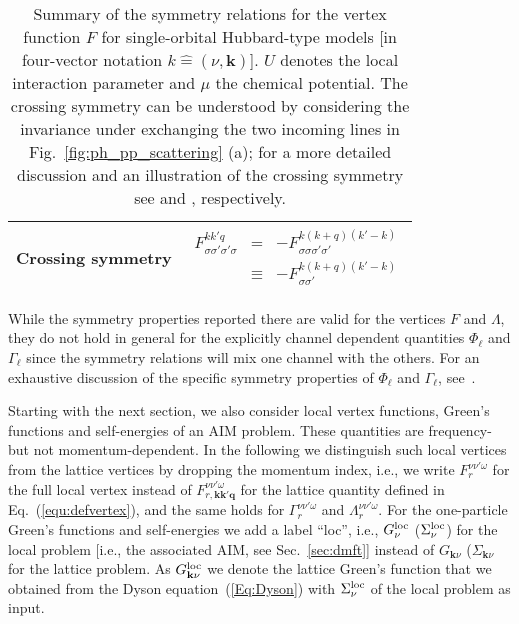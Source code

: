 \documentclass[rmp,aps,reprint,amsmath,amssymb,superscriptaddress,showpacs,nofootinbib]{revtex4-1}
\begin{document}
\begin{table}[t!]
\begin{tabular}{|m{}|m{}|}
  \begin{center} Crossing symmetry\end{center} &
\begin{eqnarray*}F_{\sigma\sigma'\sigma'\sigma}^{kk'q}&=&-F_{\sigma\sigma\sigma'\sigma'}^{k(k+q) (k'-k)}\\ &\equiv&-F_{\sigma\sigma'}^{k(k+q) (k'-k)} \end{eqnarray*}\\ \hline
\end{tabular} 
\caption{Summary of the symmetry relations for the vertex function $F$ for single-orbital Hubbard-type models 
[in four-vector notation $k\widehat{=}(\nu,\mathbf{k})$]. $U$ denotes the local interaction parameter and $\mu$ the chemical potential. The crossing symmetry can be understood by considering the invariance under exchanging  the two incoming lines 
in Fig.~\ref{fig:ph_pp_scattering} (a); for a more detailed discussion and an illustration of the crossing symmetry see  and , respectively.
\label{tab:symmetries} }
\end{table} 
While the symmetry properties reported there are valid for the vertices $F$ and $\Lambda$, they do not hold in general for the explicitly channel dependent quantities  $\Phi_{\ell}$ and $\Gamma_{\ell}$ since the symmetry relations will mix one channel with the others. For an exhaustive discussion of the specific symmetry properties of $\Phi_{\ell}$ and $\Gamma_{\ell}$, see~.

Starting with the next section, we also consider local vertex functions, Green's functions and self-energies of an AIM problem. These quantities are  frequency- but not  momentum-dependent.  In the following we distinguish such local vertices  from the lattice  vertices  by dropping the momentum index, i.e., we write  $F_{r}^{\nu\nu'\omega}$ for the full local vertex instead of $F_{r,\mathbf{k}\mathbf{k}'\mathbf{q}}^{\nu\nu'\omega}$ for the lattice quantity defined in Eq.~(\ref{equ:defvertex}), and the same holds for $\Gamma_{r}^{\nu\nu'\omega}$ and $\Lambda_{r}^{\nu\nu'\omega}$. For the one-particle Green's functions and self-energies we add a label ``loc'', i.e.,   $G^{\rm loc}_\nu$ ($\Sigma^{\rm loc}_\nu$) for the local problem [i.e., the associated AIM, see Sec.~\ref{sec:dmft}] instead of $G_{{\mathbf k}\nu}$ ($\Sigma_{{\mathbf k}\nu}$ for the lattice problem. As  $G^{\rm loc}_{{\mathbf k}\nu}$ we denote the lattice Green's  function that we obtained from the  Dyson equation~(\ref{Eq:Dyson}) with $\Sigma^{\rm loc}_\nu$ of the local problem as input.
\end{document}

